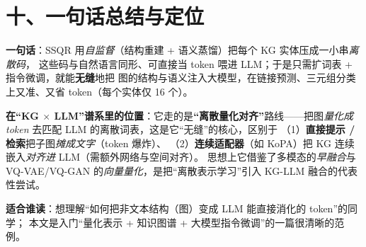 \documentclass[11pt,UTF8,fontset=fandol]{ctexart}
\begin{document}
\section{十、一句话总结与定位}

\textbf{一句话}：SSQR 用\emph{自监督}（结构重建 + 语义蒸馏）把每个 KG 实体压成一小串\emph{离散码}，
这些码与自然语言同形、可直接当 token 喂进 LLM；于是只需扩词表 + 指令微调，就能\textbf{无缝}地把
图的结构与语义注入大模型，在链接预测、三元组分类上又准、又省 token（每个实体仅 16 个）。

\textbf{在“KG $\times$ LLM”谱系里的位置}：它走的是\textbf{“离散量化对齐”}路线——把图\emph{量化成 token}
去匹配 LLM 的离散词表，这是它“无缝”的核心，区别于
（1）\textbf{直接提示 / 检索}把子图\emph{摊成文字}（token 爆炸）、
（2）\textbf{连续适配器}（如 KoPA）把 KG 连续嵌入\emph{对齐进} LLM（需额外网络与空间对齐）。
思想上它借鉴了多模态的\emph{早融合}与 VQ-VAE/VQ-GAN 的\emph{向量量化}，是把“离散表示学习”引入
KG-LLM 融合的代表性尝试。

\textbf{适合谁读}：想理解“如何把非文本结构（图）变成 LLM 能直接消化的 token”的同学；
本文是入门“量化表示 + 知识图谱 + 大模型指令微调”的一篇很清晰的范例。
\end{document}
